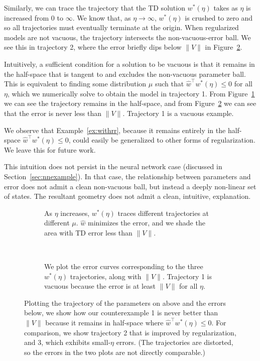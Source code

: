 Similarly, we can trace the trajectory that the TD solution $w^*(\eta)$ takes as $\eta$ is increased from 0 to $\infty$. We know that, as $\eta\to\infty$, $w^*(\eta)$ is crushed to zero and so all trajectories must eventually terminate at the origin. When regularized models are not vacuous, the trajectory intersects the non-vacuous-error ball. We see this in trajectory 2, where the error briefly dips below $\|V\|$ in Figure~\ref{fig:giplots}.

Intuitively, a sufficient condition for a solution to be vacuous is that it remains in the half-space that is tangent to and excludes the non-vacuous parameter ball. This is equivalent to finding some distribution $\mu$ such that $\hat w^\top w^*(\eta) \leq 0$ for all $\eta$, which we numerically solve to obtain the model in trajectory 1. From Figure~\ref{fig:gigeometry} we can see the trajectory remains in the half-space, and from Figure~\ref{fig:giplots} we can see that the error is never less than $\|V\|$. Trajectory 1 is a vacuous example.

We observe that Example~\ref*{ex:withrr}, because it remains entirely in the half-space $\hat w^\top w^*(\eta) \leq 0$, could easily be generalized to other forms of regularization. We leave this for future work.

This intuition does not persist in the neural network case (discussed in Section~\ref{sec:nnexample}). In that case, the relationship between parameters and error does not admit a clean non-vacuous ball, but instead a deeply non-linear set of states. The resultant geometry does not admit a clean, intuitive, explanation.

\begin{figure} \centering
	\begin{subfigure}[t]{0.8\textwidth}
		\centering
		
		\caption{As $\eta$ increases, $w^*(\eta)$ traces different trajectories at different $\mu$. $\hat w$ minimizes the error, and we shade the area with TD error less than $\|V\|$. }\label{fig:gigeometry}
	\end{subfigure}
	\\
	\begin{subfigure}[t]{0.8\textwidth}
		\centering
		
		\caption{We plot the error curves corresponding to the three $w^*(\eta)$ trajectories, along with $\|V\|$. Trajectory 1 is vacuous because the error is at least $\|V\|$ for all $\eta$. }\label{fig:giplots}
	\end{subfigure}
	\caption{Plotting the trajectory of the parameters on above and the errors below, we show how our counterexample 1 is never better than $\|V\|$ because it remains in half-space where $\hat w^\top w^*(\eta) \leq 0$. For comparison, we show trajectory 2 that is improved by regularization, and 3, which exhibits small-$\eta$ errors. (The trajectories are distorted, so the errors in the two plots are not directly comparable.) }
	\label{fig:gi}
\end{figure}

